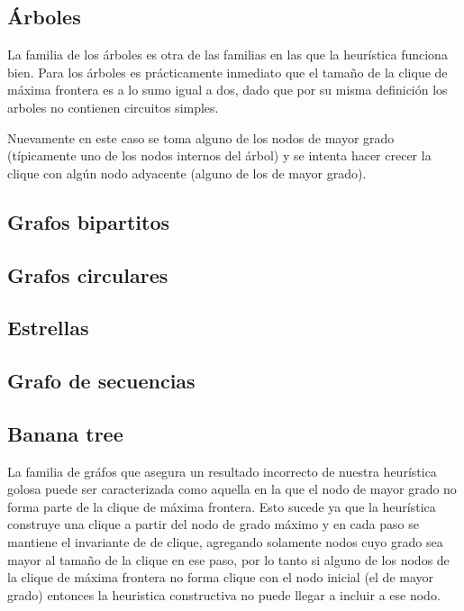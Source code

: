 \subsection{\'Arboles}
La familia de los \'arboles es otra de las familias en las que la heur\'istica
funciona bien. Para los \'arboles es pr\'acticamente inmediato que el 
tama\~no de la clique de m\'axima frontera es a lo sumo igual a dos, dado
que por su misma definici\'on los arboles no contienen circuitos simples.

Nuevamente en este caso se toma alguno de los nodos de mayor grado 
(t\'ipicamente uno de los nodos internos del \'arbol) y se intenta hacer
crecer la clique con alg\'un nodo adyacente (alguno de los de mayor grado).

\subsection{Grafos bipartitos}

\subsection{Grafos circulares}

\subsection{Estrellas}

\subsection{Grafo de secuencias}

\subsection{Banana tree}
	




La familia de gr\'afos que asegura un resultado incorrecto de nuestra 
heur\'istica golosa puede ser caracterizada como aquella en la que el
nodo de mayor grado no forma parte de la clique de m\'axima frontera.
Esto sucede ya que la heur\'istica construye una clique a partir del 
nodo de grado m\'aximo y en cada paso se mantiene el invariante de 
de clique, agregando solamente nodos cuyo grado sea mayor al tama\~no
de la clique en ese paso, por lo tanto si alguno de los nodos de la 
clique de m\'axima frontera no forma clique con el nodo 
inicial (el de mayor grado) entonces la heuristica constructiva no 
puede llegar a incluir a ese nodo.

